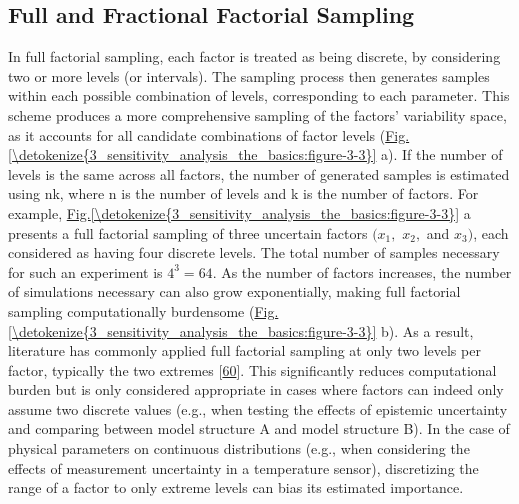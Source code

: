 \documentclass[letterpaper,10pt,english]{sphinxmanual}
\begin{document}
\subsection{Full and Fractional Factorial Sampling}
\label{\detokenize{3_sensitivity_analysis_the_basics:full-and-fractional-factorial-sampling}}
\sphinxAtStartPar
In full factorial sampling, each factor is treated as being discrete, by considering two or more levels (or intervals). The sampling process then generates samples within each possible combination of levels, corresponding to each parameter. This scheme produces a more comprehensive sampling of the factors’ variability space, as it accounts for all candidate combinations of factor levels (\hyperref[\detokenize{3_sensitivity_analysis_the_basics:figure-3-3}]{Fig.\@ \ref{\detokenize{3_sensitivity_analysis_the_basics:figure-3-3}}} a). If the number of levels is the same across all factors, the number of generated samples is estimated using nk, where n is the number of levels and k is the number of factors. For example, \hyperref[\detokenize{3_sensitivity_analysis_the_basics:figure-3-3}]{Fig.\@ \ref{\detokenize{3_sensitivity_analysis_the_basics:figure-3-3}}} a presents a full factorial sampling of three uncertain factors \((x_1,\) \(x_2,\) and \(x_3)\), each considered as having four discrete levels. The total number of samples necessary for such an experiment is \(4^3=64\). As the number of factors increases, the number of simulations necessary can also grow exponentially, making full factorial sampling computationally burdensome (\hyperref[\detokenize{3_sensitivity_analysis_the_basics:figure-3-3}]{Fig.\@ \ref{\detokenize{3_sensitivity_analysis_the_basics:figure-3-3}}} b). As a result, literature has commonly applied full factorial sampling at only two levels per factor, typically the two extremes {[}\hyperlink{cite.index:id32}{60}{]}. This significantly reduces computational burden but is only considered appropriate in cases where factors can indeed only assume two discrete values (e.g., when testing the effects of epistemic uncertainty and comparing between model structure A and model structure B). In the case of physical parameters on continuous distributions (e.g., when considering the effects of measurement uncertainty in a temperature sensor), discretizing the range of a factor to only extreme levels can bias its estimated importance.
\end{document}
